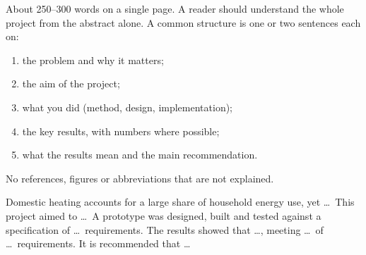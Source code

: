 
\begin{guidance}
About 250--300 words on a single page. A reader should understand the whole
project from the abstract alone. A common structure is one or two sentences
each on:
\begin{enumerate}
  \item the problem and why it matters;
  \item the aim of the project;
  \item what you did (method, design, implementation);
  \item the key results, with numbers where possible;
  \item what the results mean and the main recommendation.
\end{enumerate}
No references, figures or abbreviations that are not explained.
\end{guidance}

Domestic heating accounts for a large share of household energy use, yet
\ldots\ This project aimed to \ldots\ A prototype was designed, built and
tested against a specification of \ldots\ requirements. The results showed
that \ldots, meeting \ldots\ of \ldots\ requirements. It is recommended
that \ldots
